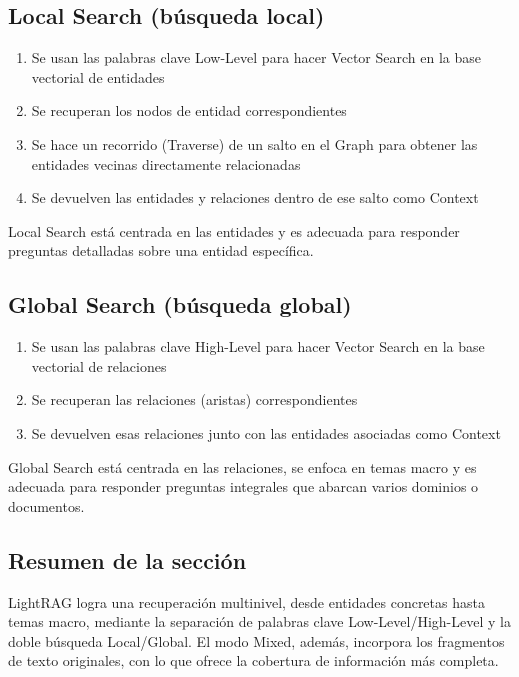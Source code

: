 \subsection{Local Search (búsqueda local)}

\begin{enumerate}
    \item Se usan las palabras clave Low-Level para hacer Vector Search en la base vectorial de entidades
    \item Se recuperan los nodos de entidad correspondientes
    \item Se hace un recorrido (Traverse) de un salto en el Graph para obtener las entidades vecinas directamente relacionadas
    \item Se devuelven las entidades y relaciones dentro de ese salto como Context
\end{enumerate}

Local Search está centrada en las entidades y es adecuada para responder preguntas detalladas sobre una entidad específica.

\subsection{Global Search (búsqueda global)}

\begin{enumerate}
    \item Se usan las palabras clave High-Level para hacer Vector Search en la base vectorial de relaciones
    \item Se recuperan las relaciones (aristas) correspondientes
    \item Se devuelven esas relaciones junto con las entidades asociadas como Context
\end{enumerate}

Global Search está centrada en las relaciones, se enfoca en temas macro y es adecuada para responder preguntas integrales que abarcan varios dominios o documentos.

\subsection{Resumen de la sección}

LightRAG logra una recuperación multinivel, desde entidades concretas hasta temas macro, mediante la separación de palabras clave Low-Level/High-Level y la doble búsqueda Local/Global. El modo Mixed, además, incorpora los fragmentos de texto originales, con lo que ofrece la cobertura de información más completa.


